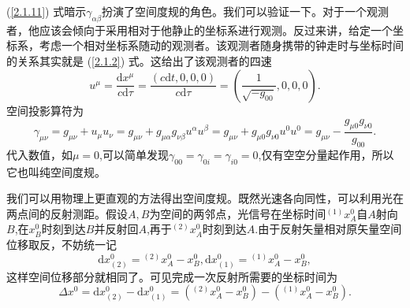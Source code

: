 \documentclass[11pt, a4paper, oneside, onecolumn]{ctexart}
\numberwithin{equation}{subsection}
\begin{document}
(\ref{2.1.11}) 式暗示$\gamma_{\alpha\beta}$扮演了空间度规的角色。我们可以验证一下。对于一个观测者，他应该会倾向于采用相对于他静止的坐标系进行观测。反过来讲，给定一个坐标系，考虑一个相对坐标系随动的观测者。该观测者随身携带的钟走时与坐标时间的关系其实就是 (\ref{2.1.2}) 式。这给出了该观测者的四速
\begin{equation}
u^{\mu}=\frac{\mathrm{d}x^{\mu}}{c\mathrm{d}\tau}=\frac{\left(c\mathrm{d}t,0,0,0\right)}{c\mathrm{d}\tau}=\left(\frac{1}{\sqrt{-g_{00}}},0,0,0\right).
\end{equation}
空间投影算符为
\begin{equation}
\gamma_{\mu\nu}=g_{\mu\nu}+u_{\mu}u_{\nu}=g_{\mu\nu}+g_{\mu\alpha}g_{\nu\beta}u^{\alpha}u^{\beta}=g_{\mu\nu}+g_{\mu0}g_{\nu0}u^{0}u^{0}=g_{\mu\nu}-\frac{g_{\mu0}g_{\nu0}}{g_{00}}.
\end{equation}
代入数值，如$\mu=0$,可以简单发现$\gamma_{00}=\gamma_{0i}=\gamma_{i0}=0$,仅有空空分量起作用，所以它也叫纯空间度规。

我们可以用物理上更直观的方法得出空间度规。既然光速各向同性，可以利用光在两点间的反射测距。假设$A,B$为空间的两邻点，光信号在坐标时间${}^{\left(1\right)}x_{A}^{0}$自$A$射向$B$,在$x_{B}^{0}$时刻到达$B$并反射回$A$,再于${}^{\left(2\right)}x_{A}^{0}$时刻到达$A$.由于反射矢量相对原矢量空间位移取反，不妨统一记
\begin{equation}
\mathrm{d}x^{0}_{\left(2\right)}={}^{\left(2\right)}x_{A}^{0}-x_{B}^{0},\mathrm{d}x^{0}_{\left(1\right)}={}^{\left(1\right)}x_{A}^{0}-x_{B}^{0},
\end{equation}
这样空间位移部分就相同了。可见完成一次反射所需要的坐标时间为
\begin{equation}
\Delta{}x^{0}=\mathrm{d}x^{0}_{\left(2\right)}-\mathrm{d}x^{0}_{\left(1\right)}=\left({}^{\left(2\right)}x_{A}^{0}-x^{0}_{B}\right)-\left({}^{\left(1\right)}x_{A}^{0}-x^{0}_{B}\right).
\end{equation}
\end{document}
